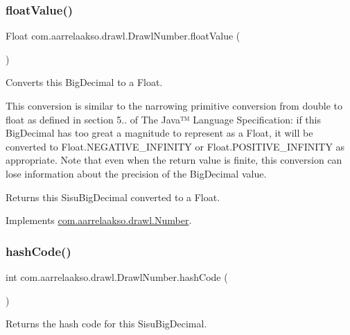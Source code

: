 \subsubsection{\texorpdfstring{float\+Value()}{floatValue()}}
{\footnotesize\ttfamily Float com.\+aarrelaakso.\+drawl.\+Drawl\+Number.\+float\+Value (\begin{DoxyParamCaption}{ }\end{DoxyParamCaption})}



Converts this Big\+Decimal to a Float. 

This conversion is similar to the narrowing primitive conversion from double to float as defined in section 5.. of The Java™ Language Specification\+: if this Big\+Decimal has too great a magnitude to represent as a Float, it will be converted to Float.\+N\+E\+G\+A\+T\+I\+V\+E\+\_\+\+I\+N\+F\+I\+N\+I\+TY or Float.\+P\+O\+S\+I\+T\+I\+V\+E\+\_\+\+I\+N\+F\+I\+N\+I\+TY as appropriate. Note that even when the return value is finite, this conversion can lose information about the precision of the Big\+Decimal value.

\begin{DoxyReturn}{Returns}
this Sisu\+Big\+Decimal converted to a Float. 
\end{DoxyReturn}


Implements \hyperlink{interfacecom_1_1aarrelaakso_1_1drawl_1_1_number_ad6df5caf5478cc3f85cc808cf39a0610}{com.\+aarrelaakso.\+drawl.\+Number}.

\mbox{\label{classcom_1_1aarrelaakso_1_1drawl_1_1_drawl_number_a0048361007923e4b902a4581eb9ba45c}} 
\subsubsection{\texorpdfstring{hash\+Code()}{hashCode()}}
{\footnotesize\ttfamily int com.\+aarrelaakso.\+drawl.\+Drawl\+Number.\+hash\+Code (\begin{DoxyParamCaption}{ }\end{DoxyParamCaption})}



Returns the hash code for this Sisu\+Big\+Decimal. 

